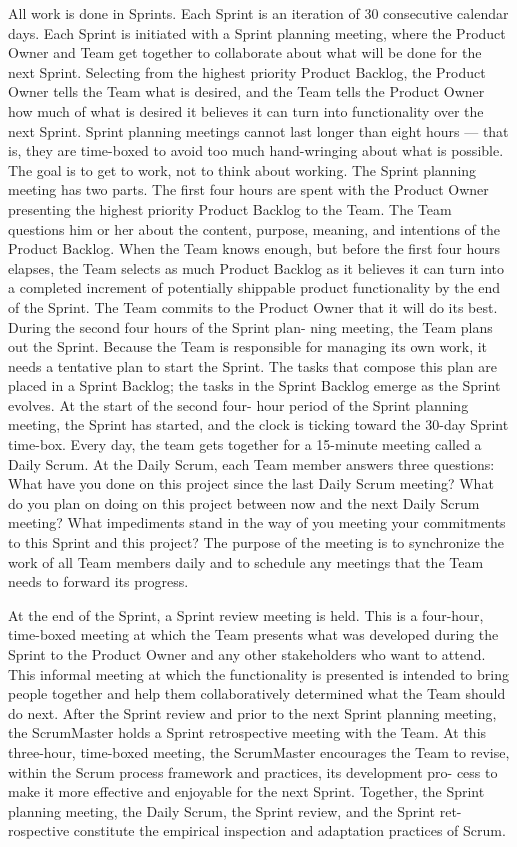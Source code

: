 All work is done in Sprints. Each Sprint is an iteration of 30 consecutive calendar days. Each Sprint is initiated with a Sprint planning meeting, where the Product Owner and Team get together to collaborate about what will be done for the next Sprint. Selecting from the highest priority Product Backlog, the Product Owner tells the Team what is desired, and the Team tells the Product Owner how much of what is desired it believes it can turn into functionality over the next Sprint. Sprint planning meetings cannot last longer than eight hours — that is, they are time-boxed to avoid too much hand-wringing about what is possible. The goal is to get to work, not to think about working. The Sprint planning meeting has two parts. The first four hours are spent with the Product Owner presenting the highest priority Product Backlog to the Team. The Team questions him or her about the content, purpose, meaning, and intentions of the Product Backlog. When the Team knows enough, but before the first four hours elapses, the Team selects as much Product Backlog as it believes it can turn into a completed increment of potentially shippable product functionality by the end of the Sprint. The Team commits to the Product Owner that it will do its best. During the second four hours of the Sprint plan- ning meeting, the Team plans out the Sprint. Because the Team is responsible for managing its own work, it needs a tentative plan to start the Sprint. The tasks that compose this plan are placed in a Sprint Backlog; the tasks in the Sprint Backlog emerge as the Sprint evolves. At the start of the second four- hour period of the Sprint planning meeting, the Sprint has started, and the clock is ticking toward the 30-day Sprint time-box. Every day, the team gets together for a 15-minute meeting called a Daily Scrum. At the Daily Scrum, each Team member answers three questions: What have you done on this project since the last Daily Scrum meeting? What do you plan on doing on this project between now and the next Daily Scrum meeting? What impediments stand in the way of you meeting your commitments to this Sprint and this project? The purpose of the meeting is to synchronize the work of all Team members daily and to schedule any meetings that the Team needs to forward its progress.

At the end of the Sprint, a Sprint review meeting is held. This is a four-hour, time-boxed meeting at which the Team presents what was developed during the Sprint to the Product Owner and any other stakeholders who want to attend. This informal meeting at which the functionality is presented is intended to bring people together and help them collaboratively determined what the Team should do next. After the Sprint review and prior to the next Sprint planning meeting, the ScrumMaster holds a Sprint retrospective meeting with the Team. At this three-hour, time-boxed meeting, the ScrumMaster encourages the Team to revise, within the Scrum process framework and practices, its development pro- cess to make it more effective and enjoyable for the next Sprint. Together, the Sprint planning meeting, the Daily Scrum, the Sprint review, and the Sprint ret- rospective constitute the empirical inspection and adaptation practices of Scrum.


